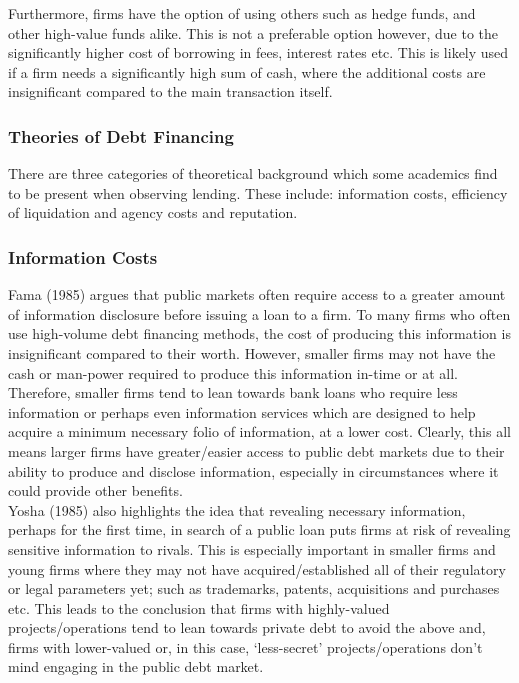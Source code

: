 \documentclass[11pt, english]{article}
\begin{document}
	Furthermore, firms have the option of using others such as hedge funds, and other high-value funds alike. This is not a preferable option however, due to the significantly higher cost of borrowing in fees, interest rates etc. This is likely used if a firm needs a significantly high sum of cash, where the additional costs are insignificant compared to the main transaction itself.

		\subsubsection*{Theories of Debt Financing}

	There are three categories of theoretical background which some academics find to be present when observing lending. These include: information costs, efficiency of liquidation and agency costs and reputation.

		\subsubsection*{Information Costs}

	Fama (1985) argues that public markets often require access to a greater amount of information disclosure before issuing a loan to a firm. To many firms who often use high-volume debt financing methods, the cost of producing this information is insignificant compared to their worth. However, smaller firms may not have the cash or man-power required to produce this information in-time or at all. Therefore, smaller firms tend to lean towards bank loans who require less information or perhaps even information services which are designed to help acquire a minimum necessary folio of information, at a lower cost. Clearly, this all means larger firms have greater/easier access to public debt markets due to their ability to produce and disclose information, especially in circumstances where it could provide other benefits.\\

	Yosha (1985) also highlights the idea that revealing necessary information, perhaps for the first time, in search of a public loan puts firms at risk of revealing sensitive information to rivals. This is especially important in smaller firms and young firms where they may not have acquired/established all of their regulatory or legal parameters yet; such as trademarks, patents, acquisitions and purchases etc. This leads to the conclusion that firms with highly-valued projects/operations tend to lean towards private debt to avoid the above and, firms with lower-valued or, in this case, ‘less-secret’ projects/operations don’t mind engaging in the public debt market.
\end{document}
